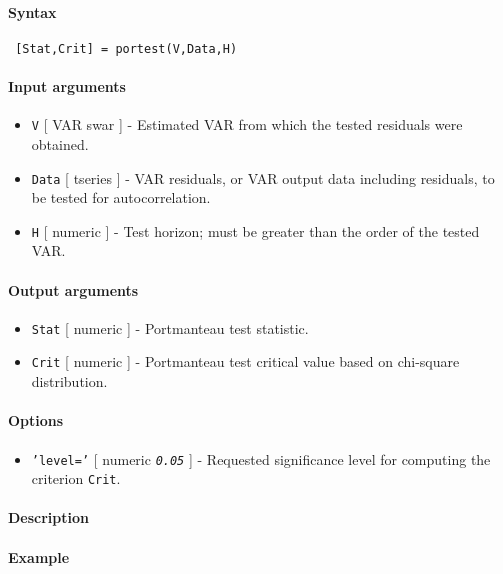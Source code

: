 


	\paragraph{Syntax}
 
 \begin{verbatim}
 [Stat,Crit] = portest(V,Data,H)
 \end{verbatim}
 
 \paragraph{Input arguments}
 
 \begin{itemize}
 \item
   \texttt{V} {[} VAR \textbar{} swar {]} - Estimated VAR from which the
   tested residuals were obtained.
 \item
   \texttt{Data} {[} tseries {]} - VAR residuals, or VAR output data
   including residuals, to be tested for autocorrelation.
 \item
   \texttt{H} {[} numeric {]} - Test horizon; must be greater than the
   order of the tested VAR.
 \end{itemize}
 
 \paragraph{Output arguments}
 
 \begin{itemize}
 \item
   \texttt{Stat} {[} numeric {]} - Portmanteau test statistic.
 \item
   \texttt{Crit} {[} numeric {]} - Portmanteau test critical value based
   on chi-square distribution.
 \end{itemize}
 
 \paragraph{Options}
 
 \begin{itemize}
 \item
   \texttt{'level='} {[} numeric \textbar{} \emph{\texttt{0.05}} {]} -
   Requested significance level for computing the criterion
   \texttt{Crit}.
 \end{itemize}
 
 \paragraph{Description}
 
 \paragraph{Example}


